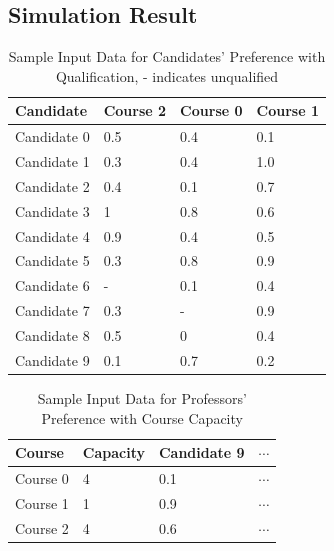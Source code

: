 \documentclass[twoside,twocolumn]{article}
\begin{document}
    \subsection{Simulation Result}
    \begin{table}[t]
        \centering
        \begin{tabular}{|l|l|l|l|}
        \hline
        Candidate   & Course 2    & Course 0    & Course 1 \\ \hline
        Candidate 0 & 0.5         & 0.4         & 0.1      \\ \hline
        Candidate 1 & 0.3         & 0.4         & 1.0      \\ \hline
        Candidate 2 & 0.4         & 0.1         & 0.7      \\ \hline
        Candidate 3 & 1           & 0.8         & 0.6      \\ \hline
        Candidate 4 & 0.9         & 0.4         & 0.5      \\ \hline
        Candidate 5 & 0.3         & 0.8         & 0.9      \\ \hline
        Candidate 6 & - & 0.1         & 0.4      \\ \hline
        Candidate 7 & 0.3         & - & 0.9      \\ \hline
        Candidate 8 & 0.5         & 0           & 0.4      \\ \hline
        Candidate 9 & 0.1         & 0.7         & 0.2      \\ \hline
        \end{tabular}
        \caption{Sample Input Data for Candidates' Preference with Qualification, - indicates unqualified}
    \end{table}
    \begin{table}[t]
        \centering
        \begin{tabular}{|l|l|l|l|}
        \hline
        Course   & Capacity & Candidate 9 & $\cdots$ \\ \hline
        Course 0 & 4        & 0.1         & $\cdots$ \\ \hline
        Course 1 & 1        & 0.9         & $\cdots$ \\ \hline
        Course 2 & 4        & 0.6         & $\cdots$ \\ \hline
        \end{tabular}
        \caption{Sample Input Data for Professors' Preference with Course Capacity}
    \end{table}
\end{document}
